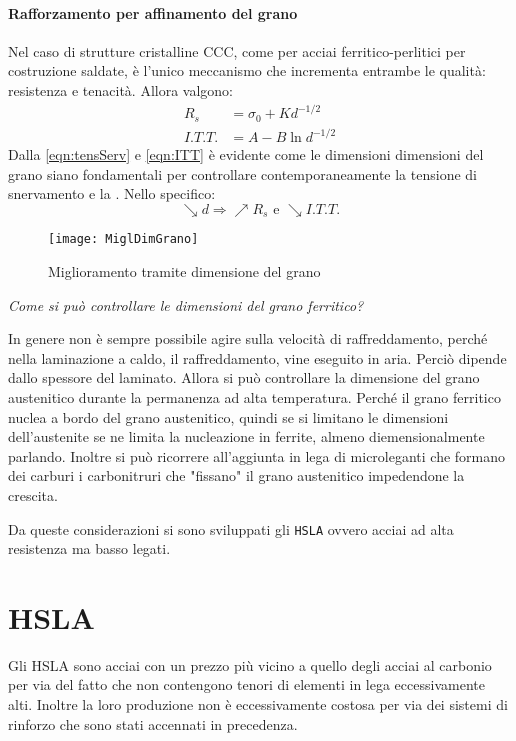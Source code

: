 \paragraph{Rafforzamento per affinamento del grano}
Nel caso di strutture cristalline CCC, come per acciai 
ferritico-perlitici per costruzione saldate, è l'unico meccanismo 
che incrementa entrambe le qualità: resistenza e tenacità.
Allora valgono:
\begin{align}
R_s &= \sigma_0 + K d^{-1/2} \label{eqn:tensServ}\\
I.T.T. &= A - B \ln d^{-1/2} \label{eqn:ITT}
\end{align}
Dalla \eqref{eqn:tensServ} e \eqref{eqn:ITT} è evidente come le 
dimensioni dimensioni del grano siano fondamentali per controllare
contemporaneamente la tensione di snervamento e la . Nello specifico:
\begin{equation}
\searrow d \Rightarrow \nearrow R_s \text{ e } \searrow I.T.T.
\label{eqn:RelMigli}
\end{equation}

\begin{figure}
\centering
\texttt{[image: MiglDimGrano]}
\caption{Miglioramento tramite dimensione del grano}
\label{fig:MiglDimGrano}
\end{figure}

\begin{center}
\emph{Come si può controllare le dimensioni del grano ferritico?}
\end{center}
In genere non è sempre possibile agire sulla velocità di raffreddamento, 
perché nella laminazione a caldo, il raffreddamento, vine eseguito in 
aria. Perciò dipende dallo spessore del laminato.
Allora si può controllare la dimensione del grano austenitico durante 
la permanenza ad alta temperatura.
Perché il grano ferritico nuclea a bordo del grano austenitico, quindi 
se si limitano le dimensioni dell'austenite se ne limita la nucleazione
in ferrite, almeno diemensionalmente parlando.
Inoltre si può ricorrere all'aggiunta in lega di microleganti
che formano dei carburi i carbonitruri che "fissano" il grano
austenitico impedendone la crescita.

Da queste considerazioni si sono sviluppati gli \texttt{HSLA} ovvero
acciai ad alta resistenza ma basso legati.

\section{HSLA}
Gli \ac{HSLA} sono acciai con un prezzo più vicino a quello degli acciai 
al carbonio per via del fatto che non contengono tenori di elementi in 
lega eccessivamente alti. Inoltre la loro produzione non è eccessivamente 
costosa per via dei sistemi di rinforzo che sono stati accennati in 
precedenza.

